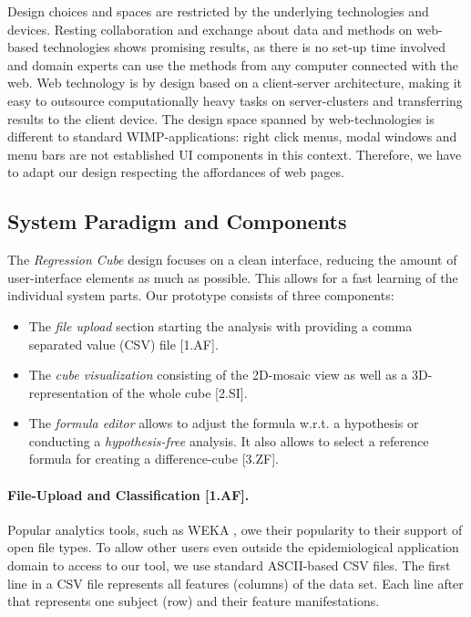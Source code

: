 \documentclass[journal]{style/vgtc} 			          %
\newcommand{\com}[1]{\textcolor{orange}{\uline{#1}}}
\begin{document}
\noindent Design choices and spaces are restricted by the underlying technologies and devices.
Resting collaboration and exchange about data and methods on web-based technologies shows promising results, as there is no set-up time involved and domain experts can use the methods from any computer connected with the web.
Web technology is by design based on a client-server architecture, making it easy to outsource computationally heavy tasks on server-clusters and transferring results to the client device.
The design space spanned by web-technologies is different to standard WIMP-applications: right click menus, modal windows and menu bars are not established UI components in this context.
Therefore, we have to adapt our design respecting the affordances of web pages.
\subsection{System Paradigm and Components}
The \emph{Regression Cube} design focuses on a clean interface, reducing the amount of user-interface elements as much as possible.
This allows for a fast learning of the individual system parts.
Our prototype consists of three components:
\begin{itemize}
	\item The \emph{file upload} section starting the analysis with providing a comma separated value (CSV) file [1.AF].
	\item The \emph{cube visualization} consisting of the 2D-mosaic view as well as a 3D-representation of the whole cube [2.SI].
	\item The \emph{formula editor} allows to adjust the formula w.r.t. a hypothesis or conducting a \emph{hypothesis-free} analysis.
	It also allows to select a reference formula for creating a difference-cube [3.ZF].
\end{itemize}
\paragraph{File-Upload and Classification [1.AF].}
Popular analytics tools, such as WEKA \cite{WEKA}, owe their popularity to their support of open file types.
To allow other users even outside the epidemiological application domain to access to our tool, we use standard ASCII-based CSV files.
The first line in a CSV file represents all features (columns) of the data set.
Each line after that represents one subject (row) and their feature manifestations.
\end{document}
